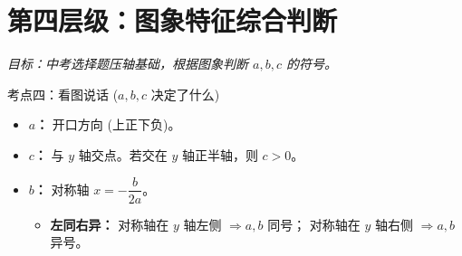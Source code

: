 \documentclass[12pt, a4paper]{article}
\begin{document}
\begin{answerblank}[第6-8题]
    \vspace{5cm}
\end{answerblank}

\newpage

\section{第四层级：图象特征综合判断}
\textit{目标：中考选择题压轴基础，根据图象判断 $a, b, c$ 的符号。}

\begin{conceptbox}{考点四：看图说话 ($a, b, c$ 决定了什么)}
    \begin{itemize}
        \item \textbf{$a$：} 开口方向 (上正下负)。
        \item \textbf{$c$：} 与 $y$ 轴交点。若交在 $y$ 轴正半轴，则 $c>0$。
        \item \textbf{$b$：} 对称轴 $x = -\dfrac{b}{2a}$。
        \begin{itemize}
            \item \textbf{左同右异：} 
            对称轴在 $y$ 轴左侧 $\Rightarrow a, b$ 同号；
            对称轴在 $y$ 轴右侧 $\Rightarrow a, b$ 异号。
        \end{itemize}
    \end{itemize}
\end{conceptbox}
\end{document}
